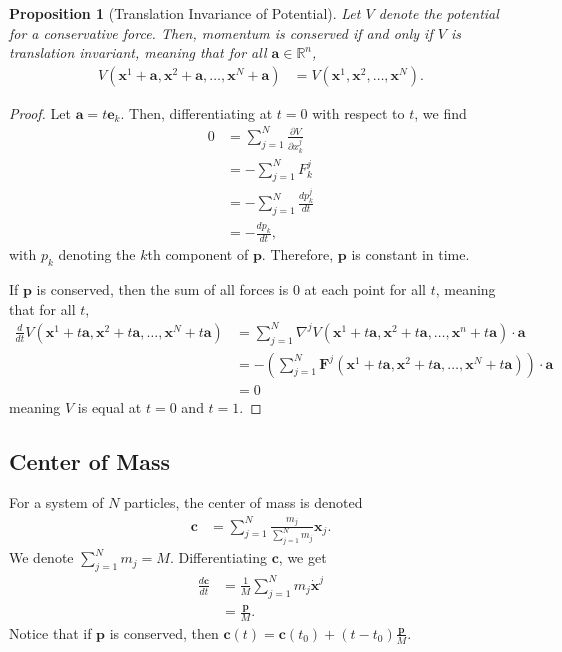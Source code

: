 \documentclass[12pt]{extarticle}
\newcommand{\R}{\mathbb{R}}
\theoremstyle{plain}
\newtheorem*{proposition}{Proposition}%
\theoremstyle{definition}
\theoremstyle{remark}
\renewcommand{\newline}{\hfill\break}
\begin{document}
  \begin{proposition}[Translation Invariance of Potential]
  Let $V$ denote the potential for a conservative force. Then, momentum is conserved if and only if $V$ is translation invariant, meaning that for all $\mathbf{a}\in \R^n$,
  \begin{align*}
    V(\mathbf{x}^1 + \mathbf{a},\mathbf{x}^2 + \mathbf{a},\dots,\mathbf{x}^N+\mathbf{a}) &= V(\mathbf{x}^1,\mathbf{x}^2,\dots,\mathbf{x}^N).
  \end{align*}
  \end{proposition}
  \begin{proof}
  Let $\mathbf{a} = t\mathbf{e}_k$. Then, differentiating at $t=0$ with respect to $t$, we find
      \begin{align*}
        0 &= \sum_{j=1}^{N}\frac{\partial V}{\partial x_{k}^j}\\
          &= -\sum_{j=1}^{N}F^{j}_k\\
          &= -\sum_{j=1}^{N}\frac{dp_{k}^j}{dt}\\
          &= -\frac{dp_k}{dt},
      \end{align*}
      with $p_k$ denoting the $k$th component of $\mathbf{p}$. Therefore, $\mathbf{p}$ is constant in time.\newline

      If $\mathbf{p}$ is conserved, then the sum of all forces is $0$ at each point for all $t$, meaning that for all $t$,
      \begin{align*}
        \frac{d}{dt}V(\mathbf{x}^1 + t\mathbf{a} , \mathbf{x}^2 + t\mathbf{a},\dots,\mathbf{x}^N + t\mathbf{a}) &= \sum_{j=1}^{N}\nabla^jV(\mathbf{x}^1 + t\mathbf{a},\mathbf{x}^2 + t\mathbf{a},\dots,\mathbf{x}^n + t\mathbf{a})\cdot \mathbf{a}\\
                                                                                              &= -\left(\sum_{j=1}^{N}\mathbf{F}^j(\mathbf{x}^1 + t\mathbf{a}, \mathbf{x}^2 + t\mathbf{a},\dots,\mathbf{x}^N + t\mathbf{a})\right)\cdot \mathbf{a}\\
                                                                                              &= 0
      \end{align*}
      meaning $V$ is equal at $t=0$ and $t=1$.
  \end{proof}
  \subsection{Center of Mass}%
  For a system of $N$ particles, the center of mass is denoted
  \begin{align*}
    \mathbf{c} &= \sum_{j=1}^{N}\frac{m_j}{\sum_{j=1}^{N}m_j}\mathbf{x}_j.
  \end{align*}
  We denote $\sum_{j=1}^{N}m_j = M$. Differentiating $\mathbf{c}$, we get
  \begin{align*}
    \frac{d\mathbf{c}}{dt} &= \frac{1}{M}\sum_{j=1}^{N}m_j\mathbf{\dot{x}}^j\\
                        &= \frac{\mathbf{p}}{M}.
  \end{align*}
  Notice that if $ \mathbf{p} $ is conserved, then $ \mathbf{c}(t) = \mathbf{c}(t_0) + (t-t_0)\frac{ \mathbf{p} }{M}$.\newline
\end{document}
